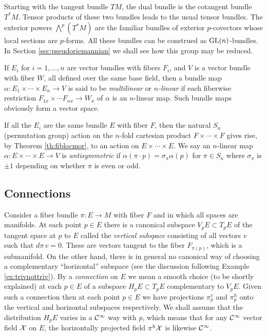 \documentclass[12pt,titlepage]{article}
\def\cC{{\cal C}}
\def\cX{{\cal X}}
\def\GL{\hbox{GL}}
\begin{document}
Starting with the tangent bundle \(TM\), the dual bundle is the
cotangent bundle \(T^*M\). Tensor products of these two bundles leads to
the usual tensor bundles. The exterior powers \(\bigwedge^p(T^*M)\) are
the familiar bundles of exterior \(p\)-covectors whose local sections
are \(p\)-forms. All these bundles can be construed as \(\GL(n)\)-bundles. 
In Section \ref{sec:pseudoriemannian} we shall see how this group
may be reduced. 

If \(E_i\) for \(i=1,\dots,n\) are vector bundles with fibers \(F_i\),
and \(V\) is a vector bundle with fiber \(W\), all defined over the same
base field, then a  bundle map \(\alpha:E_1\times\cdots\times 
E_n \to V\) is
said to be {\em multilinear\/}
%
or {\em \(n\)-linear\/}
%
if each fiberwise restriction \(F_{1x}\times\cdots F_{nx}\to W_x\)
of \(\alpha\) 
is an \(n\)-linear map. Such bundle maps obviously form a vector space.

If all the \(E_i\) are the same bundle \(E\) with fiber \(F\), then the
natural  \(S_n\) (permutation group) action  on the
\(n\)-fold cartesian product \(F\times\cdots\times F\) gives rise,
by Theorem \ref{th:fiblocmor}, 
 to an
action on \(E\times\cdots\times E\). We say an \(n\)-linear map 
\(\alpha:E\times\cdots\times E \to V\) is {\em  antisymmetric\/}
%
if \(\alpha(\pi\cdot p) = \sigma_\pi \alpha(p)\) for \(\pi \in S_n\)
where \(\sigma_\pi\) is \(\pm 1\) depending on whether \(\pi\) is even
or odd.

\subsection{Connections}\label{sec:connect} 

Consider a fiber bundle  \(\pi:E \to M\) with fiber \(F\) and
in which all spaces are manifolds.
At each point \(p\in E\) there is a canonical subspace \(V_pE \subset
T_pE\)
% 
of the tangent space at \(p\) to \(E\) called the {\em vertical
subspace\/}
%
 consisting of all vectors \(v\) such that \(d\pi\,v = 0\).
These are vectors tangent to the fiber \(F_{\pi(p)}\), which is a
submanifold.
On the other
hand, there is in general no canonical way of choosing a complementary
``horizontal'' subspace (see the discussion following
Example \ref{ex:trivnottriv}).  By a {\em connection\/}
%
 on \(E\) we mean a
smooth
choice (to be shortly explained) at each \(p\in E\)
of a subspace \(H_pE\subset T_pE\)
%
complementary to \(V_pE\).  Given such a connection then at each
point \(p\in E\) we have projections \(\pi^v_p\)
 and \(\pi^h_p\)
%
onto
the vertical and horizontal subspaces respectively. We shall assume
 that the distribution \(H_pE\) varies in
a \(\cC^\infty\) way with \(p\), which means that for any
\(\cC^\infty\) vector field \(\cX\) on \(E\), the horizontally projected
field
\(\pi^h\cX\) is likewise \(\cC^\infty\).
\end{document}
